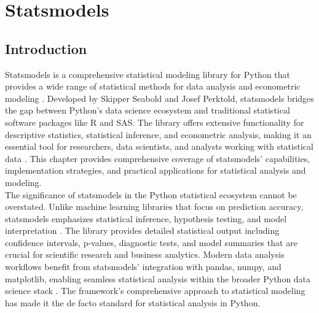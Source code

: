 %
%
%


%
%

\chapter{Statsmodels}
\label{ch:statsmodels}

\section{Introduction}
\label{sec:intro}

Statsmodels is a comprehensive statistical modeling library for Python that provides a wide range of statistical methods for data analysis and econometric modeling \cite{Statsmodels:2024}. Developed by Skipper Seabold and Josef Perktold, statsmodels bridges the gap between Python's data science ecosystem and traditional statistical software packages like R and SAS. The library offers extensive functionality for descriptive statistics, statistical inference, and econometric analysis, making it an essential tool for researchers, data scientists, and analysts working with statistical data \cite{Seabold:2010}. This chapter provides comprehensive coverage of statsmodels' capabilities, implementation strategies, and practical applications for statistical analysis and modeling.\\

The significance of statsmodels in the Python statistical ecosystem cannot be overstated. Unlike machine learning libraries that focus on prediction accuracy, statsmodels emphasizes statistical inference, hypothesis testing, and model interpretation \cite{Perktold:2023}. The library provides detailed statistical output including confidence intervals, p-values, diagnostic tests, and model summaries that are crucial for scientific research and business analytics. Modern data analysis workflows benefit from statsmodels' integration with pandas, numpy, and matplotlib, enabling seamless statistical analysis within the broader Python data science stack \cite{McKinney:2012}. The framework's comprehensive approach to statistical modeling has made it the de facto standard for statistical analysis in Python.\\

